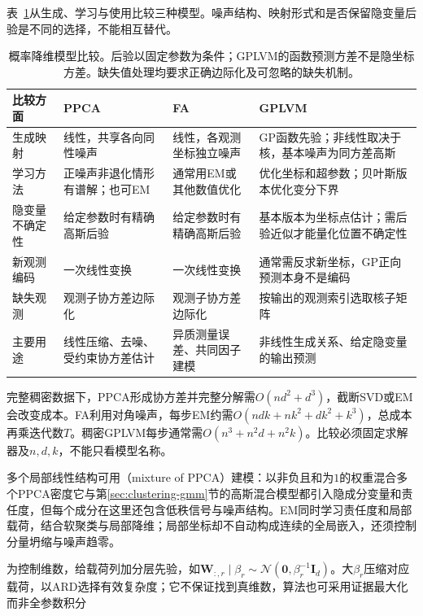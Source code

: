 表~\ref{tab:dim-probabilistic-comparison}从生成、学习与使用比较三种模型。噪声结构、映射形式和是否保留隐变量后验是不同的选择，不能相互替代。

\begin{table}[htbp]
\centering
\small
\begin{tabularx}{\linewidth}{@{}>{\raggedright\arraybackslash}p{20mm}XXX@{}}
\toprule
比较方面 & PPCA & FA & GPLVM \\
\midrule
生成映射 & 线性，共享各向同性噪声 & 线性，各观测坐标独立噪声 & GP函数先验；非线性取决于核，基本噪声为同方差高斯 \\
学习方法 & 正噪声非退化情形有谱解；也可EM & 通常用EM或其他数值优化 & 优化坐标和超参数；贝叶斯版本优化变分下界 \\
隐变量不确定性 & 给定参数时有精确高斯后验 & 给定参数时有精确高斯后验 & 基本版本为坐标点估计；需后验近似才能量化位置不确定性 \\
新观测编码 & 一次线性变换 & 一次线性变换 & 通常需反求新坐标，GP正向预测本身不是编码 \\
缺失观测 & 观测子协方差边际化 & 观测子协方差边际化 & 按输出的观测索引选取核子矩阵 \\
主要用途 & 线性压缩、去噪、受约束协方差估计 & 异质测量误差、共同因子建模 & 非线性生成关系、给定隐变量的输出预测 \\
\bottomrule
\end{tabularx}
\caption{概率降维模型比较。后验以固定参数为条件；GPLVM的函数预测方差不是隐坐标方差。缺失值处理均要求正确边际化及可忽略的缺失机制。}
\label{tab:dim-probabilistic-comparison}
\end{table}

完整稠密数据下，PPCA形成协方差并完整分解需$O(nd^2+d^3)$，截断SVD或EM会改变成本。FA利用对角噪声，每步EM约需$O(ndk+nk^2+dk^2+k^3)$，总成本再乘迭代数$T$。稠密GPLVM每步通常需$O(n^3+n^2d+n^2k)$。比较必须固定求解器及$n,d,k$，不能只看模型名称。

多个局部线性结构可用（mixture of PPCA）建模：以非负且和为$1$的权重混合多个PPCA密度它与第\ref{sec:clustering-gmm}节的高斯混合模型都引入隐成分变量和责任度，但每个成分在这里还包含低秩信号与噪声结构。EM同时学习责任度和局部载荷，结合软聚类与局部降维；局部坐标却不自动构成连续的全局嵌入，还须控制分量坍缩与噪声趋零。

为控制维数，给载荷列加分层先验，如$\bm{W}_{:,r}\mid\beta_r\sim\mathcal{N}(\bm{0},\beta_r^{-1}\bm{I}_d)$。大$\beta_r$压缩对应载荷，以ARD选择有效复杂度；它不保证找到真维数，算法也可采用证据最大化而非全参数积分

